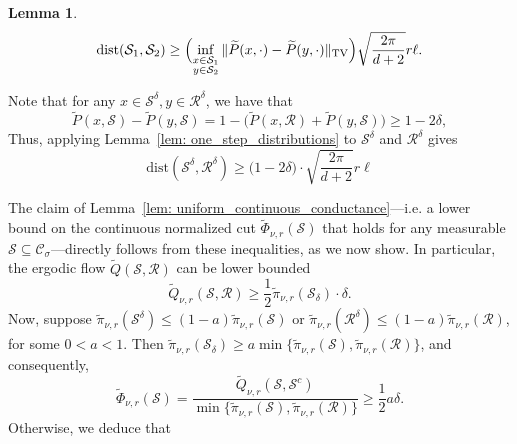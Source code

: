 \documentclass{report}
\newcommand{\1}{\mathbf{1}}
\newcommand{\mc}[1]{\mathcal{#1}}
\newcommand{\wt}[1]{\widetilde{#1}}
\newcommand{\dist}{\mathrm{dist}}
\theoremstyle{alden}
\theoremstyle{aldenthm}
\newtheorem{lemma}{Lemma}
\theoremstyle{definition}
\theoremstyle{remark}
\begin{document}
\begin{enumerate}
\begin{lemma}
		\begin{equation}
		\label{eqn:one_step_distributions_2}
		\dist(\mc{S}_1,\mc{S}_2) \geq \Bigl(\inf_{\substack{x \in \mc{S}_1 \\ y \in \mc{S}_2}}\|\wt{P}(x,\cdot) - \wt{P}(y,\cdot)\|_{\mathrm{TV}}\Bigr)\sqrt{\frac{2\pi}{d + 2}}r\ell.
		\end{equation}
	\end{lemma}
	Note that for any $x \in \mc{S}^{\delta}, y \in \mc{R}^{\delta}$, we have that
	\begin{equation*}
	\wt{P}(x,\mc{S}) - \wt{P}(y,\mc{S}) = 1 - \bigl(\wt{P}(x,\mc{R}) + \wt{P}(y,\mc{S})\bigr) \geq 1 - 2\delta,
	\end{equation*}
	Thus, applying Lemma~\ref{lem: one_step_distributions} to $\mc{S}^{\delta}$ and $\mc{R}^{\delta}$ gives
	\begin{equation*}
	\dist(\mc{S}^{\delta},\mc{R}^{\delta}) \geq \bigl(1 - 2\delta\bigr) \cdot \sqrt{\frac{2\pi}{d + 2}}r\ell
	\end{equation*}
\end{enumerate}
The claim of Lemma~\ref{lem: uniform_continuous_conductance}---i.e. a lower bound on the continuous normalized cut $\wt{\Phi}_{\nu,r}(\mc{S})$ that holds for any measurable $\mc{S} \subseteq \mc{C}_{\sigma}$---directly follows from these inequalities, as we now show. In particular, the ergodic flow $\wt{Q}(\mc{S},\mc{R})$ can be lower bounded
\begin{equation*}
\wt{Q}_{\nu,r}(\mc{S},\mc{R}) \geq \frac{1}{2}\wt{\pi}_{\nu,r}(\mc{S}_{\delta}) \cdot \delta. \tag{Step 1}
\end{equation*}
Now, suppose $\wt{\pi}_{\nu,r}(\mc{S}^{\delta}) \leq (1 - a) \wt{\pi}_{\nu,r}(\mc{S})$ or $\wt{\pi}_{\nu,r}(\mc{R}^{\delta}) \leq (1 - a) \wt{\pi}_{\nu,r}(\mc{R})$, for some $0 < a < 1$. Then $\wt{\pi}_{\nu,r}(\mc{S}_{\delta}) \geq a \min\{\wt{\pi}_{\nu,r}(\mc{S}),\wt{\pi}_{\nu,r}(\mc{R})\}$, and consequently,
\begin{equation*}
\wt{\Phi}_{\nu,r}(\mc{S}) = \frac{\wt{Q}_{\nu,r}(\mc{S},\mc{S}^c)}{\min\{\wt{\pi}_{\nu,r}(\mc{S}),\wt{\pi}_{\nu,r}(\mc{R})\}} \geq \frac{1}{2}a \delta.
\end{equation*}
Otherwise, we deduce that
\end{document}
